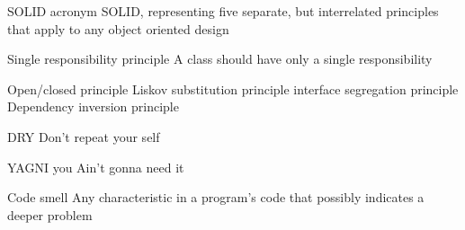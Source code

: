 SOLID 
  acronym SOLID, representing five separate, but interrelated principles that apply to any object oriented design

Single responsibility principle 
  A class should have only a single responsibility

Open/closed principle 
Liskov substitution principle 
interface segregation principle
Dependency inversion principle 

DRY 
Don't repeat your self 

YAGNI 
you Ain't gonna need it 

Code smell 
  Any characteristic in a program's code that possibly indicates a deeper problem 